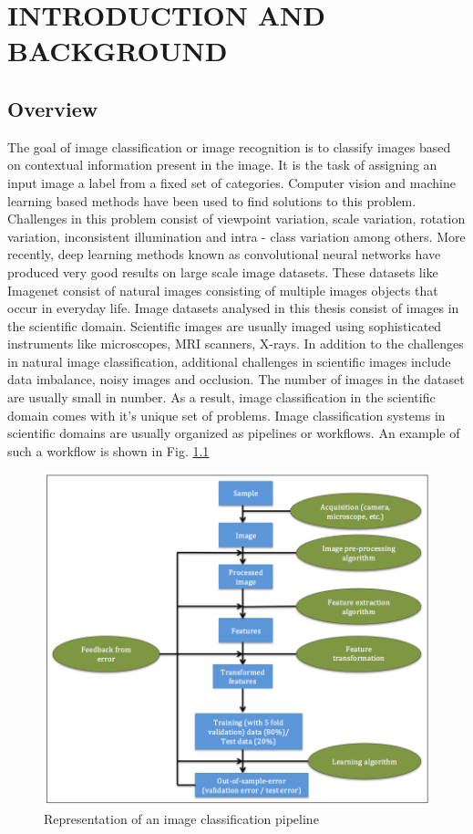 \chapter{INTRODUCTION AND BACKGROUND}
\label{chap:intro}

\section{Overview}
The goal of image classification or image recognition is to classify images based on contextual information present in the image. It is the task of assigning an input image a label from a fixed set of categories. Computer vision and machine learning based methods have been used to find solutions to this problem. Challenges in this problem consist of viewpoint variation, scale variation, rotation variation, inconsistent illumination and intra - class variation among others. More recently, deep learning methods known as convolutional neural networks have produced very good results on large scale image datasets. These datasets like Imagenet \cite{deng2009imagenet} consist of natural images consisting of multiple images objects that occur in everyday life. Image datasets analysed in this thesis consist of images in the scientific domain. Scientific images are usually imaged using sophisticated instruments like microscopes, MRI scanners, X-rays. In addition to the challenges in natural image classification, additional challenges in scientific images include data imbalance, noisy images and  occlusion. The number of images in the dataset are usually small in number. As a result, image classification in the scientific domain comes with it's unique set of problems. 
Image classification systems in scientific domains are usually organized as pipelines or workflows. An example of such a workflow is shown in Fig.  \ref{fig:flowchart1}

\begin{figure}[ht!]
    \centering
    \includegraphics[scale=0.5]{img/EP/flowchart}
    \caption{Representation of an image classification pipeline}
\label{fig:flowchart1}
\end{figure}

